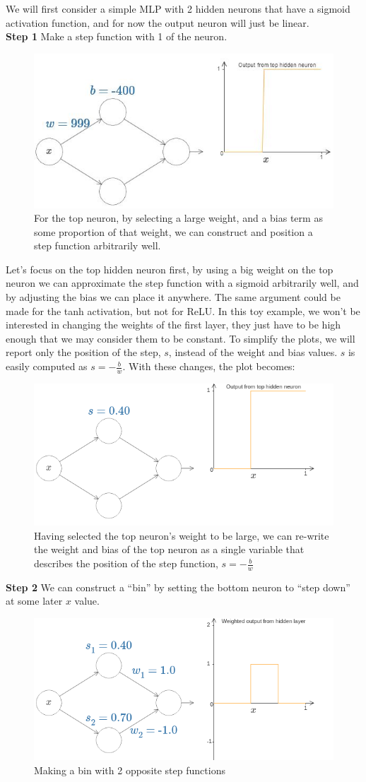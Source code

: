 \documentclass{article}
\begin{document}
We will first consider a simple MLP with 2 hidden neurons that have a sigmoid activation function, and for now the output neuron will just be linear. \\

\textbf{Step 1} Make a step function with 1 of the neuron.
\begin{figure}[H]
    \centering
    \includegraphics[width=.6\textwidth]{figures/high_weight_function.jpg}
    \caption{For the top neuron, by selecting a large weight, and a bias term as some proportion of that weight, we can construct and position a step function arbitrarily well.}
\end{figure}
Let's focus on the top hidden neuron first, by using a big weight on the top neuron we can approximate the step function with a sigmoid arbitrarily well, and by adjusting the bias we can place it anywhere.
The same argument could be made for the tanh activation, but not for ReLU. In this toy example, we won't be interested in changing the weights of the first layer, they just have to be high enough that we may consider them to be constant. To simplify the plots, we will report only the position of the step, $s$, instead of the weight and bias values. $s$ is easily computed as $s = -\frac{b}{w}$. With these changes, the plot becomes:
\begin{figure}[H]
    \centering
    \includegraphics[width=.6\textwidth]{figures/2nn_s.png}
    \caption{Having selected the top neuron's weight to be large, we can re-write the weight and bias of the top neuron as a single variable that describes the position of the step function, $s = -\frac{b}{w}$}
\end{figure}

\textbf{Step 2} We can construct a ``bin'' by setting the bottom neuron to ``step down'' at some later $x$ value.
\begin{figure}[H]
    \centering
    \includegraphics[width=.6\textwidth]{figures/bin.png}
    \caption{Making a bin with 2 opposite step functions}
\end{figure}
\end{document}
